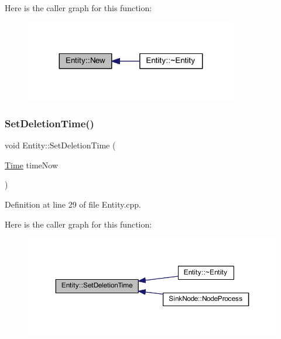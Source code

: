 Here is the caller graph for this function\+:
\nopagebreak
\begin{figure}[H]
\begin{center}
\leavevmode
\includegraphics[width=263pt]{class_entity_ab8dc894a31d5c72219fa070345d7c383_icgraph}
\end{center}
\end{figure}
\mbox{\label{class_entity_a5c0dc393f667e2af24cd11d7b4bbd82c}} 
\subsubsection{\texorpdfstring{Set\+Deletion\+Time()}{SetDeletionTime()}}
{\footnotesize\ttfamily void Entity\+::\+Set\+Deletion\+Time (\begin{DoxyParamCaption}\item[{\hyperlink{_simulation_executive_8h_ac2d3e0ba793497bcca555c7c2cf64ff3}{Time}}]{time\+Now }\end{DoxyParamCaption})}



Definition at line 29 of file Entity.\+cpp.

Here is the caller graph for this function\+:
\nopagebreak
\begin{figure}[H]
\begin{center}
\leavevmode
\includegraphics[width=350pt]{class_entity_a5c0dc393f667e2af24cd11d7b4bbd82c_icgraph}
\end{center}
\end{figure}
\mbox{\label{class_entity_ad08cf1231dbd8127e086bb803bdb3d5a}} 
